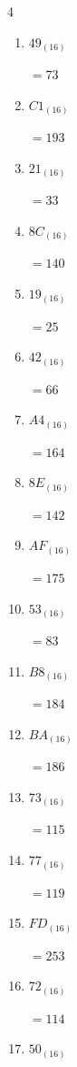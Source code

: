 \begin{multicols}{4}
\begin{enumerate}
  \item $49_{(16)}$

        $=73$

  \item $C1_{(16)}$

        $=193$

  \item $21_{(16)}$

        $=33$

  \item $8C_{(16)}$

        $=140$

  \item $19_{(16)}$

        $=25$

  \item $42_{(16)}$

        $=66$

  \item $A4_{(16)}$

        $=164$

  \item $8E_{(16)}$

        $=142$

  \item $AF_{(16)}$

        $=175$

  \item $53_{(16)}$

        $=83$

\columnbreak %

  \item $B8_{(16)}$

        $=184$

  \item $BA_{(16)}$

        $=186$

  \item $73_{(16)}$

        $=115$

  \item $77_{(16)}$

        $=119$

  \item $FD_{(16)}$

        $=253$

  \item $72_{(16)}$

        $=114$

  \item $50_{(16)}$


\end{enumerate}
\end{multicols}
